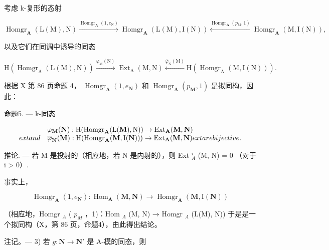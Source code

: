 考虑 k-复形的态射

\[
\operatorname{Homgr} _ {\mathbf {A}} (\mathrm{L} (\mathrm{M}), \mathrm{N}) \xrightarrow {\operatorname{Homgr} _ {\mathbf {A}} (1 , e _ {\mathrm{N}})} \operatorname{Homgr} _ {\mathbf {A}} (\mathrm{L} (\mathrm{M}), \mathrm{I} (\mathrm{N})) \xleftarrow {\operatorname{Homgr} _ {\mathbf {A}} (p _ {\mathrm{M}}, 1)} \operatorname{Homgr} _ {\mathbf {A}} (\mathrm{M}, \mathrm{I} (\mathrm{N})),
\]

以及它们在同调中诱导的同态

\[
\mathrm{H} \left(\operatorname{Homgr} _ {\mathrm{A}} (\mathrm{L} (\mathrm{M}), \mathrm{N})\right) \xrightarrow {\varphi_ {\mathrm{M}} (\mathrm{N})} \operatorname{Ext} _ {\mathrm{A}} (\mathrm{M}, \mathrm{N}) \xleftarrow {\overline {{\varphi}} _ {\mathrm{N}} (\mathrm{M})} \mathrm{H} \left(\operatorname{Homgr} _ {\mathrm{A}} (\mathrm{M}, \mathrm{I} (\mathrm{N}))\right).
\]

根据 X 第 86 页命题 4， \(\operatorname{Homgr}_{\mathbf{A}}(1, e_{\mathbf{N}})\) 和 \(\operatorname{Homgr}_{\mathbf{A}}(p_{\mathbf{M}}, 1)\) 是拟同构，因此：

命题5. --- k-同态

\[
\begin{array}{l l} & \varphi_ {\mathbf {M}} (\mathbf {N}): \mathrm{H} (\mathrm{Homgr} _ {\mathbf {A}}   (\mathrm{L} (\mathbf {M}), \mathrm{N})) \to \mathrm{Ext} _ {\mathbf {A}}   (\mathbf {M}, \mathbf {N}) \\ 	ext{and} & \overline {{\varphi}} _ {\mathbf {N}} (\mathbf {M}): \mathrm{H} (\mathrm{Homgr} _ {\mathbf {A}}   (\mathbf {M}, \mathrm{I} (\mathbf {N}))) \to \mathrm{Ext} _ {\mathbf {A}}   (\mathbf {M}, \mathbf {N}) 	ext{are bijective.} \end{array}
\]

推论. --- 若 M 是投射的（相应地，若 N 是内射的），则 Ext \(_{A}^{i}\) (M, N) = 0 （对于 i \textgreater{} 0）.

事实上，

\[
\operatorname{Homgr} _ {\mathbf {A}} \left(1, e _ {\mathbf {N}}\right): \operatorname{Hom} _ {\mathbf {A}} (\mathbf {M}, \mathbf {N}) \rightarrow \operatorname{Homgr} _ {\mathbf {A}} (\mathbf {M}, \mathrm{I} (\mathbf {N}))
\]

（相应地，Homgr \(_{A}\) ( \(p_{M}\) ，1)：Hom \(_{A}\) (M, N) → Homgr \(_{A}\) (L(M), N)) 于是是一个拟同构（X，第 86 页，命题4），由此得出结论。

注记。--- 3) 若 \(g: \mathbf{N} \to \mathbf{N}'\) 是 A-模的同态，则

